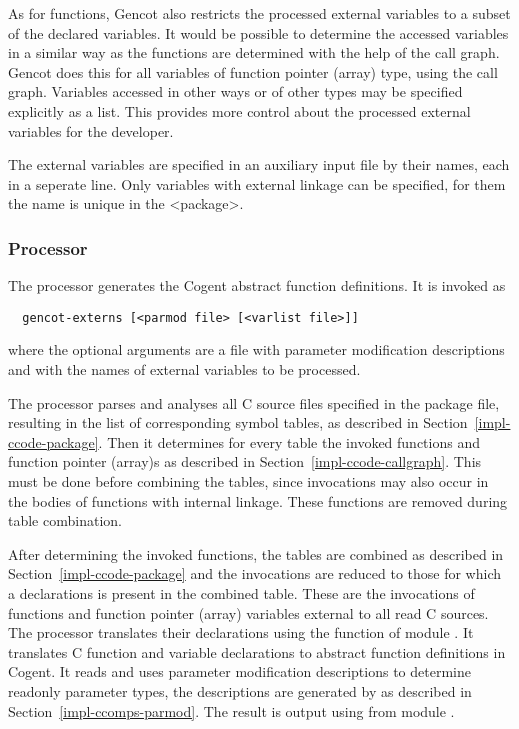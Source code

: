 As for functions, Gencot also restricts the processed external variables to a subset of the declared variables.
It would be possible to determine the accessed variables in a similar way as the functions are determined with
the help of the call graph. Gencot does this for all variables of function pointer (array) type, using the 
call graph. Variables accessed in other ways or of other types may be specified explicitly as a list. This
provides more control about the processed external variables for the developer.

The external variables are specified in an auxiliary input file by their names, each in a seperate line. Only
variables with external linkage can be specified, for them the name is unique in the <package>.

\subsubsection{Processor }

The processor  generates the Cogent abstract function definitions. It is invoked as
\begin{verbatim}
  gencot-externs [<parmod file> [<varlist file>]]
\end{verbatim}
where the optional arguments are a file with parameter modification descriptions and with the names of external
variables to be processed.

The processor parses and analyses
all C source files specified in the package file, resulting in the list of corresponding symbol tables, as
described in Section~\ref{impl-ccode-package}. Then
it determines for every table the invoked functions and function pointer (array)s as described in 
Section~\ref{impl-ccode-callgraph}. This must
be done before combining the tables, since invocations may also occur in the bodies of functions with internal
linkage. These functions are removed during table combination.

After determining the invoked functions, the tables are combined as described in Section~\ref{impl-ccode-package}
and the invocations are reduced to those for
which a declarations is present in the combined table. These are the invocations of functions and function
pointer (array) variables external to all
read C sources. The processor translates their declarations using the function  of
module . It translates C function and variable declarations to abstract function 
definitions
in Cogent. It reads and uses parameter modification descriptions to determine readonly parameter types, the
descriptions are generated by  as described in Section~\ref{impl-ccomps-parmod}.
The result is output using  from module .


